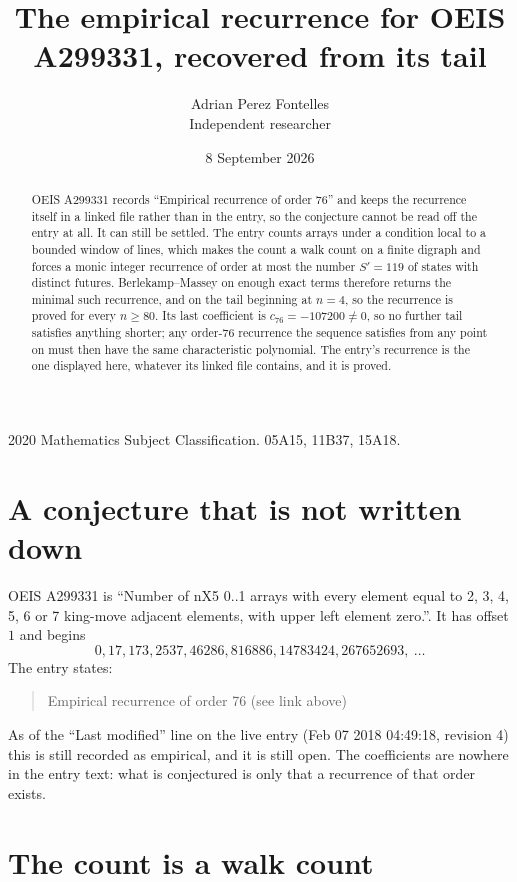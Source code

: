 \documentclass[11pt,a4paper]{article}
\title{The empirical recurrence for OEIS A299331, recovered from its tail}
\author{Adrian Perez Fontelles\\ \small Independent researcher}
\date{8 September 2026}
\theoremstyle{plain}
\theoremstyle{definition}
\begin{document}
\maketitle

\begin{abstract}
OEIS A299331 records ``Empirical recurrence of order $76$'' and keeps the recurrence itself in
a linked file rather than in the entry, so the conjecture cannot be read off the entry at all.
It can still be settled. The entry counts arrays under a condition local to a bounded window of
lines, which makes the count a walk count on a finite digraph and forces a monic integer
recurrence of order at most the number $S'=119$ of states with distinct futures. Berlekamp--Massey on
enough exact terms therefore returns the minimal such recurrence, and on the tail beginning at $n=4$, so the recurrence is proved for every $n\ge80$.
Its last coefficient is $c_{76}=-107200\neq0$, so no further tail satisfies anything
shorter; any order-$76$ recurrence the sequence satisfies from any point on must then have
the same characteristic polynomial. The entry's recurrence is the one displayed here, whatever
its linked file contains, and it is proved.
\end{abstract}

\noindent\small 2020 Mathematics Subject Classification. 05A15, 11B37, 15A18.\normalsize

\section{A conjecture that is not written down}

OEIS A299331 is ``Number of nX5 0..1 arrays with every element equal to 2, 3, 4, 5, 6 or 7 king-move adjacent elements, with upper left element zero.''. It has offset $1$ and begins
\[
0, 17, 173, 2537, 46286, 816886, 14783424, 267652693,\ \dots
\]
The entry states:
\begin{quote}
Empirical recurrence of order 76 (see link above)
\end{quote}
As of the ``Last modified'' line on the live entry (Feb 07 2018 04:49:18, revision 4)
this is still recorded as empirical, and it is still open. The coefficients are nowhere in the
entry text: what is conjectured is only that a recurrence of that order exists.

\section{The count is a walk count}
\end{document}
